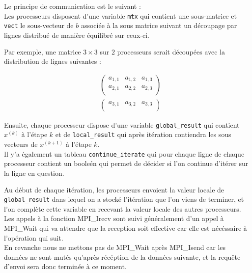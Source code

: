 \documentclass[11pt, a4paper]{article}
\begin{document}
Le principe de communication est le suivant :\\

Les processeurs disposent d'une variable \texttt{mtx} qui contient une sous-matrice et \texttt{vect} le sous-vecteur de $b$ associée à la sous matrice suivant un découpage par lignes distribué de manière équilibré sur ceux-ci.

Par exemple, une matrice $3 \times 3$ sur $2$ processeurs serait découpées avec la distribution de lignes suivantes :

\begin{align*}
    &\begin{pmatrix}
        a_{1,1} & a_{1,2} & a_{1,3}\\
        a_{2,1} & a_{2,2} & a_{2,3}\\
    \end{pmatrix} \\
    &\begin{pmatrix}
        a_{3,1} & a_{3,2} & a_{3,3}\\
    \end{pmatrix}
\end{align*}


Ensuite, chaque processeur dispose d'une variable \texttt{global\_result} qui contient $x^{(k)}$ à l'étape $k$ et de \texttt{local\_result} qui après itération contiendra les sous vecteurs de $x^{(k+1)}$ à l'étape $k$.\\

Il y'a également un tableau \texttt{continue\_iterate} qui pour chaque ligne de chaque processeur contient un booleén qui permet de décider si l'on continue d'itérer sur la ligne en question.

Au début de chaque itération, les processeurs envoient la valeur locale de \texttt{global\_result} dans lequel on a stocké l'itération que l'on viens de terminer, et l'on complète cette variable en recevant la valeur locale des autres processeurs.\\

Les appels à la fonction MPI\_Irecv sont suivi généralement d'un appel à MPI\_Wait qui va attendre que la reception soit effective car elle est nécéssaire à l'opération qui suit.\\

En revanche nous ne mettons pas de MPI\_Wait après MPI\_Isend car les données ne sont mutés qu'après récéption de la données suivante, et la requ\^ete d'envoi sera donc terminée à ce moment.\\
\end{document}
